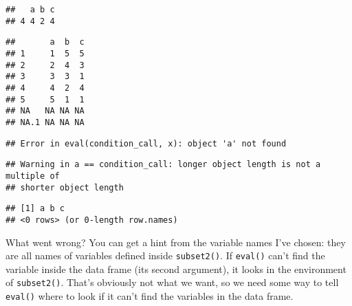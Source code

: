 \begin{verbatim}
##   a b c
## 4 4 2 4
\end{verbatim}

\begin{Shaded}
\begin{Highlighting}[]
\OperatorTok{==}\StringTok{ }
\end{Highlighting}
\end{Shaded}

\begin{verbatim}
##       a  b  c
## 1     1  5  5
## 2     2  4  3
## 3     3  3  1
## 4     4  2  4
## 5     5  1  1
## NA   NA NA NA
## NA.1 NA NA NA
\end{verbatim}

\begin{Shaded}
\begin{Highlighting}[]
\OperatorTok{==}\StringTok{ }
\end{Highlighting}
\end{Shaded}

\begin{verbatim}
## Error in eval(condition_call, x): object 'a' not found
\end{verbatim}

\begin{Shaded}
\begin{Highlighting}[]
\OperatorTok{==}\StringTok{ }
\end{Highlighting}
\end{Shaded}

\begin{verbatim}
## Warning in a == condition_call: longer object length is not a multiple of
## shorter object length
\end{verbatim}

\begin{verbatim}
## [1] a b c
## <0 rows> (or 0-length row.names)
\end{verbatim}

What went wrong? You can get a hint from the variable names I've chosen:
they are all names of variables defined inside \texttt{subset2()}. If
\texttt{eval()} can't find the variable inside the data frame (its
second argument), it looks in the environment of \texttt{subset2()}.
That's obviously not what we want, so we need some way to tell
\texttt{eval()} where to look if it can't find the variables in the data
frame.

